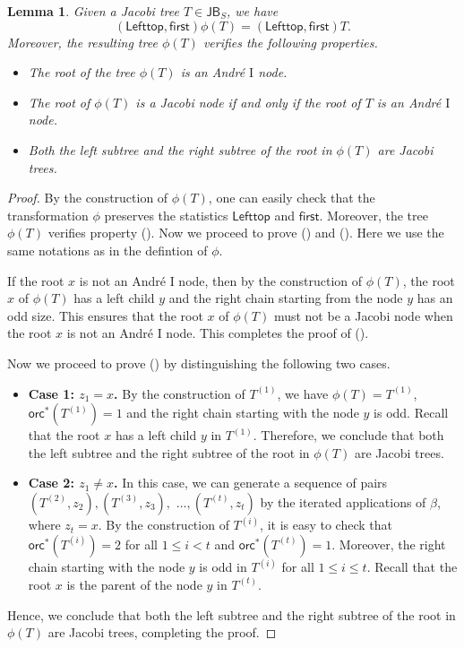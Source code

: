 \documentclass[12pt]{article}
\numberwithin{equation}{section}
\theoremstyle{plain}
\newcommand{\rmnum}[1]{\romannumeral #1}
\newtheorem{lemma}[theorem]{Lemma}
\def\orc{\mathsf{orc}}
\def\JB{\mathsf{JB}}
\def\first{\mathsf{first}}
\def\Lefttop{\mathsf{Lefttop}}
\begin{document}
   \begin{lemma}\label{lem-phi}
   	Given  a Jacobi tree $T\in \JB_S$,  we have \begin{equation}\label{eq-phi}
   		(\Lefttop, \first)\phi(T)=(\Lefttop, \first)T.
   	\end{equation} 
   	Moreover, the resulting tree $\phi(T)$ verifies the following  properties.
   	\begin{itemize}
   		\item[\upshape(\rmnum{1})] The root of the tree $\phi(T)$  is an Andr\'e  $\mathrm{I}$ node.
   		
   		\item[\upshape(\rmnum{2})]  The root of $\phi(T)$ is a Jacobi node if and only if the root of $T$ is an  Andr\'e $\mathrm{I}$ node.
   		\item[\upshape(\rmnum{3})]    Both the left subtree and the right subtree of the root in $\phi(T)$ are Jacobi trees.
   		\end{itemize}
   	\end{lemma}
   	 \begin{proof}
   	 	By the construction of $\phi(T)$, one can easily check that   the transformation $\phi$ preserves the statistics $\Lefttop$ and $\first$. Moreover, the tree $\phi(T)$ verifies property  (\rmnum{1}).  Now we proceed to prove (\rmnum{2}) and  (\rmnum{3}).   Here we use the same notations as in the defintion of $\phi$.  
   	 	
   	 	
   	 	If the root $x$ is not an Andr\'e $\mathrm{I}$ node,  then by the construction of $\phi(T)$, the root $x$ of $\phi(T)$ has a left child $y$ and the right  chain starting from the node $y$  has an odd size. This ensures that the root $x$ of $\phi(T)$ must not  be a Jacobi node when the root $x$ is not an Andr\'e  $\mathrm{I}$ node. This completes the proof of (\rmnum{2}). 
		
		Now we proceed to prove (\rmnum{3}) by distinguishing  the following two cases. 
  \begin{itemize} 	 	
 \item{\bf Case 1: $z_1=x$.}
   	 	By the construction of $T^{(1)}$,   we have $\phi(T)=T^{(1)}$,  $\orc^*(T^{(1)})=1$ and the right chain starting with the node $y$ is odd.  Recall that the root $x$  has a left child $y$ in $T^{(1)}$. Therefore, we conclude that  both the left subtree and the right subtree of the root in $\phi(T)$ are Jacobi trees.
   	  	 	 
   	 	 \item{\bf Case 2: $z_1\neq x$.}
   	 	In this case,  we can generate a sequence of pairs $(T^{(2)}, z_2), (T^{(3)}, z_3),$ $ \ldots, (T^{(t)}, z_t)$ by the  iterated applications of $\beta$, where $z_t=x$.    By the construction of  $T^{(i)}$,   it is easy to check that $\orc^*(T^{(i)})=2$ for all $1\leq i<t$ and $\orc^*(T^{(t)})=1$. Moreover,  the right chain starting with the node $y$ is odd in $T^{(i)}$ for all $1\leq i\leq t$. Recall that the root $x$ is the parent of the node $y$ in $T^{(t)}$. 
		\end{itemize}
		Hence, we conclude that both the left subtree and the right subtree of the root in $\phi(T)$ are Jacobi trees, completing the proof.
   	 	\end{proof}
   	 	
\end{document}
